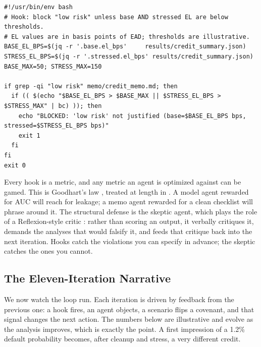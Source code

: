 \begin{listing}[t]
\begin{verbatim}
#!/usr/bin/env bash
# Hook: block "low risk" unless base AND stressed EL are below thresholds.
# EL values are in basis points of EAD; thresholds are illustrative.
BASE_EL_BPS=$(jq -r '.base.el_bps'     results/credit_summary.json)
STRESS_EL_BPS=$(jq -r '.stressed.el_bps' results/credit_summary.json)
BASE_MAX=50; STRESS_MAX=150

if grep -qi "low risk" memo/credit_memo.md; then
  if (( $(echo "$BASE_EL_BPS > $BASE_MAX || $STRESS_EL_BPS > $STRESS_MAX" | bc) )); then
    echo "BLOCKED: 'low risk' not justified (base=$BASE_EL_BPS bps, stressed=$STRESS_EL_BPS bps)"
    exit 1
  fi
fi
exit 0
\end{verbatim}
\caption{The ``low risk'' threshold gate as a post-write hook. The phrase is only
permitted when both expected-loss figures clear explicit thresholds, removing the
writer's discretion over a load-bearing word.}
\label{lst:lowrisk-hook}
\end{listing}

\begin{remark}
Every hook is a metric, and any metric an agent is optimized against can be gamed.
This is Goodhart's law \citep{goodhart1984}, treated at length in
. A model agent rewarded for AUC will reach for leakage; a memo
agent rewarded for a clean checklist will phrase around it. The structural defense
is the skeptic agent, which plays the role of a Reflexion-style critic
\citep{shinn2023reflexion}: rather than scoring an output, it verbally critiques
it, demands the analyses that would falsify it, and feeds that critique back into
the next iteration. Hooks catch the violations you can specify in advance; the
skeptic catches the ones you cannot.
\end{remark}

\subsection{The Eleven-Iteration Narrative}\label{subsec:credit-iterations}

We now watch the loop run. Each iteration is driven by feedback from the previous
one: a hook fires, an agent objects, a scenario flips a covenant, and that signal
changes the next action. The numbers below are illustrative and evolve as the
analysis improves, which is exactly the point. A first impression of a 1.2\%
default probability becomes, after cleanup and stress, a very different credit.


